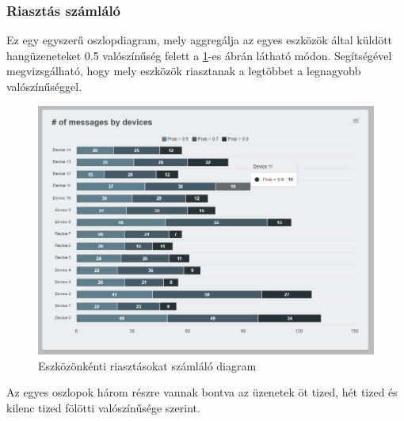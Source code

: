 \subsubsection{Riasztás számláló}
Ez egy egyszerű oszlopdiagram, mely aggregálja az egyes eszközök által küldött hangüzeneteket 0.5 valószínűség felett a \ref{fig:dashboard-devices-column}-es ábrán látható módon.
Segítségével megvizsgálható, hogy mely eszközök riasztanak a legtöbbet a legnagyobb valószínűséggel.
\begin{figure}[!ht]
    \centering
    \includegraphics[width=150mm, keepaspectratio]{figures/dashboard-column-devices.png}
    \caption{Eszközönkénti riasztásokat számláló diagram}
    \label{fig:dashboard-devices-column}
\end{figure}

Az egyes oszlopok három részre vannak bontva az üzenetek öt tized, hét tized és kilenc tized fölötti valószínűsége szerint. 
\newpage
